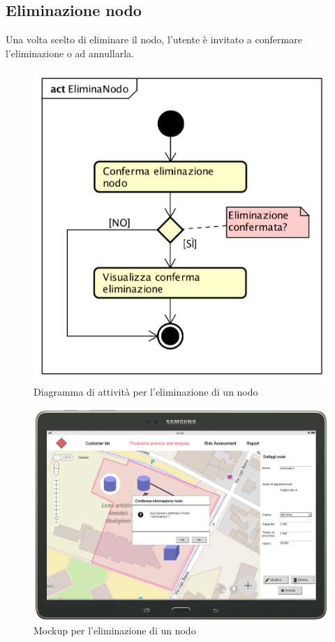 \newpage
\subsection{Eliminazione nodo}
Una volta scelto di eliminare il nodo, l'utente è invitato a confermare l'eliminazione o ad annullarla.
\begin{figure}[H]
	\centering
	\includegraphics[scale=0.7]{img/DiagrammiDiAttivita/EliminazioneNodo.png}
	\caption{Diagramma di attività per l'eliminazione di un nodo}
\end{figure}
\begin{figure}[H]
	\centering
	\includegraphics[width=\textwidth]{img/MockUp/m16.png}
	\caption{Mockup per l'eliminazione di un nodo}
\end{figure}


